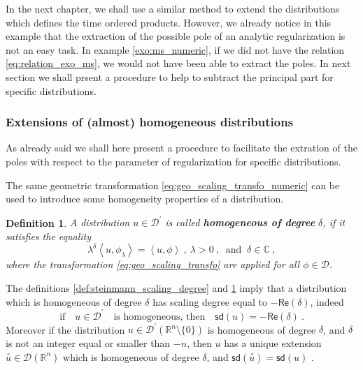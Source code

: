 \documentclass[11pt]{book}
\newcommand{\sd}{\mathsf{sd}}
\renewcommand{\Re}{\mathsf{Re}}
\newcommand{\sm}[1]{\left\langle#1\right\rangle}
\newcommand{\exte}[1]{\overset{\circ}{#1}}
\newcommand{\Dcal}{\mathcal{D}}
\newcommand{\Cbb}{\mathbb{C}}
\newcommand{\Rbb}{\mathbb{R}}
\theoremstyle{break}
\newtheorem{definition}{Definition}[chapter]
\begin{document}
In the next chapter, we shall use a similar method to extend the distributions which defines the time ordered products. However, we already notice in this example that the extraction of the possible pole of an analytic regularization is not an easy task. In example \ref{exo:ms_numeric}, if we did not have the relation \eqref{eq:relation_exo_ms}, we would not have been able to extract the poles. In next section we shall prsent a procedure to help to subtract the principal part for specific distributions.


\subsubsection{Extensions of (almost) homogeneous distributions}


As already said we shall here present a procedure to facilitate the extration of the poles with respect to the parameter of regularization for specific distributions.


The same geometric transformation \eqref{eq:geo_scaling_transfo_numeric} can be used to introduce some homogeneity properties of a distribution.


\begin{definition}\label{def:homogeneous_numeric}
A distribution $u \in \Dcal^\prime$ is called {\bf homogeneous of degree} $\delta$, if it satisfies the equality
%
\begin{equation}
\lambda^{\delta} \sm{ u , \phi_\lambda } = \sm{ u , \phi } \ , \ \lambda > 0 \ , \ \mbox{ and } \ \delta \in \Cbb \ ,
\label{eq:homog_id}
\end{equation}
%
where the transformation \eqref{eq:geo_scaling_transfo} are applied for all $\phi \in \Dcal$.
\end{definition}


The definitions \ref{def:steinmann_scaling_degree} and \ref{def:homogeneous_numeric} imply that a distribution which is homogeneous of degree $\delta$ has scaling degree equal to $-\Re(\delta)$, indeed
%
\begin{equation}
\mbox{if} \quad u \in \Dcal^\prime \quad \mbox{is homogeneous, then} \quad \sd(u) = -\Re(\delta) \ .
\end{equation}
%
Moreover if the distribution $u \in \Dcal^\prime(\Rbb^n\setminus \{0\})$ is homogeneous of degree $\delta$, and $\delta$ is not an integer equal or smaller than $-n$, then $u$ has a unique extension $\exte{u} \in \Dcal(\Rbb^n)$ which is homogeneous of degree $\delta$, and $\sd(\exte{u})=\sd(u)$ \cite{hormander_analysis_1990}.
\end{document}
